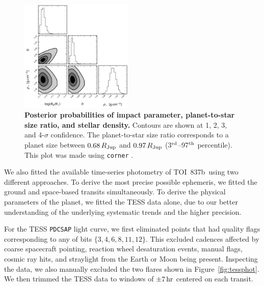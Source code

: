 \documentclass[12pt,twocolumn,tighten]{aastex63}
\newcommand{\pn}{TOI~837b} %
\begin{document}
%

\begin{figure}[!t]
	\begin{center}
		\leavevmode
		\includegraphics[width=0.48\textwidth]{f10.pdf}
	\end{center}
	\vspace{-0.3cm}
	\caption{ 
    {\bf Posterior probabilities of impact parameter, planet-to-star
    size ratio, and stellar density.} Contours are shown at 1, 2, 3,
    and 4-$\sigma$ confidence.  The planet-to-star size ratio
    corresponds to a planet size between $0.68\,R_{\rm Jup}$ and
    $0.97\,R_{\rm Jup}$ (3$^{\rm rd}$--97$^{\rm th}$ percentile).
    This plot was made using \texttt{corner} \citep{corner_2016}.
		\label{fig:subsetcorner}
	}
\end{figure}


We also fitted the available time-series photometry of \pn\ using two
different approaches.  To derive the most precise possible ephemeris,
we fitted the ground and space-based transits simultaneously.  To
derive the physical parameters of the planet, we fitted the TESS data
alone, due to our better understanding of the underlying systematic
trends and the higher precision.

For the TESS \texttt{PDCSAP} light curve, we first eliminated points
that had quality flags corresponding to any of bits $\{3, 4, 6, 8, 11,
12\}$.  This excluded cadences affected by coarse spacecraft pointing,
reaction wheel desaturation events, manual flags, cosmic ray hits, and
straylight from the Earth or Moon being present.  Inspecting the data,
we also manually excluded the two flares shown in
Figure~\ref{fig:tessphot}.  We then trimmed the TESS data to windows
of $\pm 7\,{\rm hr}$ centered on each transit.
\end{document}
